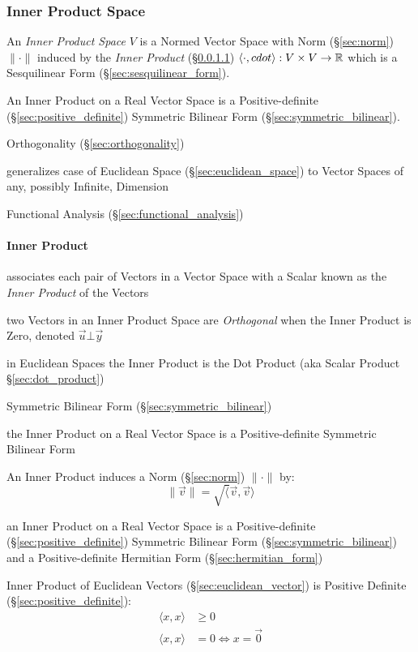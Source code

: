 \subsubsection{Inner Product Space}\label{sec:innerproduct_space}

An \emph{Inner Product Space} $V$ is a Normed Vector Space with Norm
(\S\ref{sec:norm}) $\|\cdot\|$ induced by the \emph{Inner Product}
(\S\ref{sec:inner_product}) $\langle{\cdot,cdot}\rangle : V \times V
\rightarrow \mathbb{R}$ which is a Sesquilinear Form
(\S\ref{sec:sesquilinear_form}).

An Inner Product on a Real Vector Space is a Positive-definite
(\S\ref{sec:positive_definite}) Symmetric Bilinear Form
(\S\ref{sec:symmetric_bilinear}).

\fist Orthogonality (\S\ref{sec:orthogonality})

generalizes case of Euclidean Space (\S\ref{sec:euclidean_space}) to
Vector Spaces of any, possibly Infinite, Dimension

Functional Analysis (\S\ref{sec:functional_analysis})



\paragraph{Inner Product}\label{sec:inner_product}\hfill

associates each pair of Vectors in a Vector Space with a Scalar known
as the \emph{Inner Product} of the Vectors

two Vectors in an Inner Product Space are \emph{Orthogonal} when the Inner
Product is Zero, denoted $\vec{u} \bot \vec{y}$

in Euclidean Spaces the Inner Product is the Dot Product (aka Scalar Product
\S\ref{sec:dot_product})

Symmetric Bilinear Form (\S\ref{sec:symmetric_bilinear})

the Inner Product on a Real Vector Space is a Positive-definite Symmetric
Bilinear Form

An Inner Product induces a Norm (\S\ref{sec:norm}) $\|\cdot\|$ by:
\[
  \|\vec{v}\| = \sqrt\langle{\vec{v},\vec{v}}\rangle
\]

an Inner Product on a Real Vector Space is a Positive-definite
(\S\ref{sec:positive_definite}) Symmetric Bilinear Form
(\S\ref{sec:symmetric_bilinear}) and a Positive-definite Hermitian Form
(\S\ref{sec:hermitian_form})

Inner Product of Euclidean Vectors (\S\ref{sec:euclidean_vector}) is Positive
Definite (\S\ref{sec:positive_definite}):
\begin{align*}
  \langle{x,x}\rangle & \geq 0 \\
  \langle{x,x}\rangle & =    0 \Leftrightarrow x = \vec{0} \\
\end{align*}


